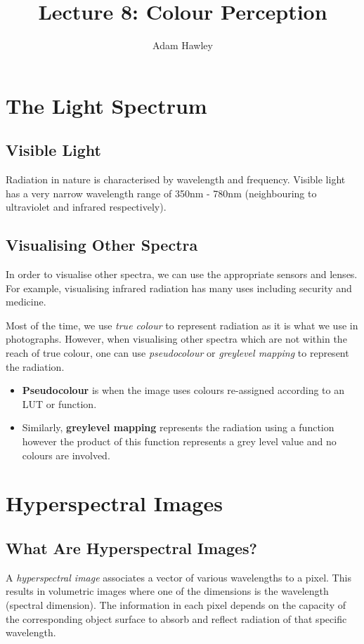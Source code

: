 \documentclass{article}
\author{Adam Hawley}
\title{Lecture 8: Colour Perception}
\begin{document}
\maketitle

\section{The Light Spectrum}
\subsection{Visible Light}
Radiation in nature is characterised by wavelength and frequency.
Visible light has a very narrow wavelength range of 350nm - 780nm (neighbouring to ultraviolet and infrared respectively).

\subsection{Visualising Other Spectra}
In order to visualise other spectra, we can use the appropriate sensors and lenses.
For example, visualising infrared radiation has many uses including security and medicine.

Most of the time, we use {\it true colour} to represent radiation as it is what we use in photographs.
However, when visualising other spectra which are not within the reach of true colour, one can use {\it pseudocolour} or {\it greylevel mapping} to represent the radiation.
\begin{itemize}
	\item {\bf Pseudocolour} is when the image uses colours re-assigned according to an LUT or function.
	\item Similarly, {\bf greylevel mapping} represents the radiation using a function however the product of this function represents a grey level value and no colours are involved.
\end{itemize}

\section{Hyperspectral Images}
\subsection{What Are Hyperspectral Images?}
A {\it hyperspectral image} associates a vector of various wavelengths to a pixel.
This results in volumetric images where one of the dimensions is the wavelength (spectral dimension).
The information in each pixel depends on the capacity of the corresponding object surface to absorb and reflect radiation of that specific wavelength.
\end{document}
